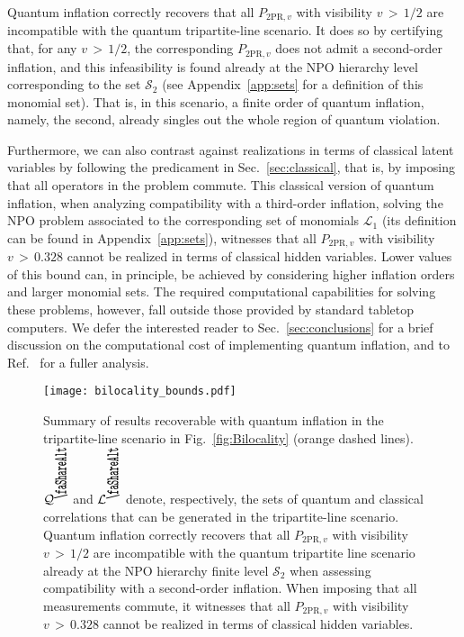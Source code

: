 \documentclass[superscriptaddress,aps,prx,nofootinbib,twocolumn,twoside,reprint,letterpaper,longbibliography]{revtex4-2}
\newcommand{\biloc}{\text{\scalebox{2}[1]{\rotatebox{90}{\faShareAlt}}}}
\begin{document}
Quantum inflation correctly recovers that all $P_{\text{2PR},v}$  with visibility $v\,{>}\,1/2$ are incompatible with the quantum tripartite-line scenario.
It does so by certifying that, for any $v\,{>}\,1/2$, the corresponding $P_{\text{2PR},v}$ does not admit a second-order inflation, and this infeasibility is found already at the NPO hierarchy level corresponding to the set $\mathcal{S}_2$ (see Appendix~\ref{app:sets} for a definition of this monomial set).
That is, in this scenario, a finite order of quantum inflation, namely, the second, already singles out the whole region of quantum violation.

Furthermore, we can also contrast against realizations in terms of classical latent variables by following the predicament in Sec.~\ref{sec:classical}, that is, by imposing that all operators in the problem commute.
This classical version of quantum inflation, when analyzing compatibility with a third-order inflation, solving the NPO problem associated to the corresponding set of monomials $\mathcal{L}_1$ (its definition can be found in Appendix~\ref{app:sets}), witnesses that all $P_{\text{2PR},v}$ with visibility $v\,{>}\,0.328$ cannot be realized in terms of classical hidden variables.
Lower values of this bound can, in principle, be achieved by considering higher inflation orders and larger monomial sets. The required computational capabilities for solving these problems, however, fall outside those provided by standard tabletop computers. We defer the interested reader to Sec.~\ref{sec:conclusions} for a brief discussion on the computational cost of implementing quantum inflation, and to Ref.~\cite[Chap. 5]{alexThesis} for a fuller analysis.
\begin{figure}[t]
  \centering
  \texttt{[image: bilocality\_bounds.pdf]}
  \caption{
  Summary of results recoverable with quantum inflation in the tripartite-line scenario in Fig.~\ref{fig:Bilocality} (orange dashed lines).
  $\mathcal{Q}^\protect\biloc$ and $\mathcal{L}^\protect\biloc$ denote, respectively, the sets of quantum and classical correlations that can be generated in the tripartite-line scenario.
  Quantum inflation correctly recovers that all $P_{\text{2PR},v}$ with visibility $v\,{>}\,1/2$ are incompatible with the quantum tripartite line scenario already at the NPO hierarchy finite level $\mathcal{S}_2$ when assessing compatibility with a second-order inflation.
  When imposing that all measurements commute, it witnesses that all $P_{\text{2PR},v}$  with visibility $v\,{>}\,0.328$ cannot be realized in terms of classical hidden variables.}
  \label{fig:line_results}
\end{figure}
\end{document}
